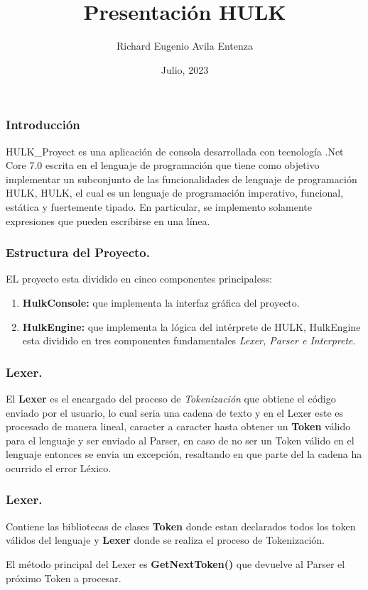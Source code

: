 \documentclass[12pt]{beamer}
\author{Richard Eugenio Avila Entenza}
\title{Presentación HULK}
\subtitle{}
\institute{Facultad de Matemática y Computación\\Universidad de la Habana}
\date{Julio, 2023}
\begin{document}
	\maketitle
	
	\begin{frame}
		\frametitle{Introducción}
		HULK\_Proyect es una aplicación de consola desarrollada con tecnología .Net Core 7.0 escrita en el lenguaje de programación  que tiene como objetivo implementar un subconjunto de las funcionalidades de lenguaje de programación HULK, HULK, el cual es un lenguaje de programación imperativo, funcional, estática y fuertemente tipado. En particular, se implemento solamente expresiones que pueden escribirse en una línea.
	\end{frame}
	
	\begin{frame}[fragile]
		\frametitle{Estructura del Proyecto.}
		
		EL proyecto esta dividido en cinco componentes principaless:
		\begin{enumerate}
			\item \textbf{HulkConsole:} que implementa la interfaz gráfica del proyecto.
			\item \textbf{HulkEngine:} que implementa la lógica del intérprete de HULK, HulkEngine esta dividido en tres componentes fundamentales \emph{Lexer, Parser e Interprete}.
		\end{enumerate}
	\end{frame}
	
	\begin{frame}[fragile]
		\frametitle{Lexer.}
		El \textbf{Lexer} es el encargado del proceso de \emph{Tokenización} que obtiene el código enviado por el usuario, lo cual seria una cadena de texto y en el Lexer este es procesado de manera lineal, caracter a caracter hasta obtener un \textbf{Token} válido para el lenguaje y ser enviado al Parser, en caso de no ser un Token válido en el lenguaje entonces se envia un excepción, resaltando en que parte del la cadena ha ocurrido el error Léxico.
	\end{frame}	
	
	\begin{frame}[fragile]
		\frametitle{Lexer.}
		Contiene las bibliotecas de clases \textbf{Token} donde estan declarados todos los token válidos del lenguaje y \textbf{Lexer} donde se realiza el proceso de Tokenización.
		
		El método principal del Lexer es \textbf{GetNextToken()} que devuelve al Parser el próximo Token a procesar.
	\end{frame}
	
\end{document}

